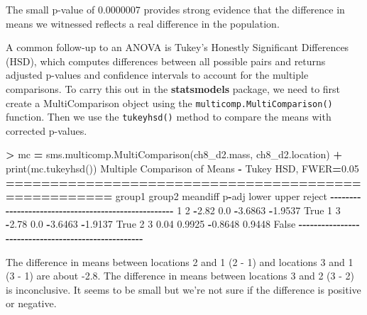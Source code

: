 \documentclass[
]{book}
\newenvironment{Shaded}{\begin{snugshade}}{\end{snugshade}}
\newcommand{\BuiltInTok}[1]{#1}
\newcommand{\DecValTok}[1]{\textcolor[rgb]{0.00,0.00,0.81}{#1}}
\newcommand{\FloatTok}[1]{\textcolor[rgb]{0.00,0.00,0.81}{#1}}
\newcommand{\NormalTok}[1]{#1}
\newcommand{\OperatorTok}[1]{\textcolor[rgb]{0.81,0.36,0.00}{\textbf{#1}}}
\newcommand{\VariableTok}[1]{\textcolor[rgb]{0.00,0.00,0.00}{#1}}
\begin{document}
The small p-value of 0.0000007 provides strong evidence that the difference in means we witnessed reflects a real difference in the population.

A common follow-up to an ANOVA is Tukey's Honestly Significant Differences (HSD), which computes differences between all possible pairs and returns adjusted p-values and confidence intervals to account for the multiple comparisons. To carry this out in the \textbf{statsmodels} package, we need to first create a MultiComparison object using the \texttt{multicomp.MultiComparison()} function. Then we use the \texttt{tukeyhsd()} method to compare the means with corrected p-values.

\begin{Shaded}
\begin{Highlighting}[]
\OperatorTok{\textgreater{}}\NormalTok{ mc }\OperatorTok{=}\NormalTok{ sms.multicomp.MultiComparison(ch8\_d2.mass, ch8\_d2.location)}
\OperatorTok{+} \BuiltInTok{print}\NormalTok{(mc.tukeyhsd())}
\NormalTok{Multiple Comparison of Means }\OperatorTok{{-}}\NormalTok{ Tukey HSD, FWER}\OperatorTok{=}\FloatTok{0.05} 
\OperatorTok{====================================================}
\NormalTok{group1 group2 meandiff p}\OperatorTok{{-}}\NormalTok{adj   lower   upper  reject}
\OperatorTok{{-}{-}{-}{-}{-}{-}{-}{-}{-}{-}{-}{-}{-}{-}{-}{-}{-}{-}{-}{-}{-}{-}{-}{-}{-}{-}{-}{-}{-}{-}{-}{-}{-}{-}{-}{-}{-}{-}{-}{-}{-}{-}{-}{-}{-}{-}{-}{-}{-}{-}{-}{-}}
     \DecValTok{1}      \DecValTok{2}    \OperatorTok{{-}}\FloatTok{2.82}    \FloatTok{0.0} \OperatorTok{{-}}\FloatTok{3.6863} \OperatorTok{{-}}\FloatTok{1.9537}   \VariableTok{True}
     \DecValTok{1}      \DecValTok{3}    \OperatorTok{{-}}\FloatTok{2.78}    \FloatTok{0.0} \OperatorTok{{-}}\FloatTok{3.6463} \OperatorTok{{-}}\FloatTok{1.9137}   \VariableTok{True}
     \DecValTok{2}      \DecValTok{3}     \FloatTok{0.04} \FloatTok{0.9925} \OperatorTok{{-}}\FloatTok{0.8648}  \FloatTok{0.9448}  \VariableTok{False}
\OperatorTok{{-}{-}{-}{-}{-}{-}{-}{-}{-}{-}{-}{-}{-}{-}{-}{-}{-}{-}{-}{-}{-}{-}{-}{-}{-}{-}{-}{-}{-}{-}{-}{-}{-}{-}{-}{-}{-}{-}{-}{-}{-}{-}{-}{-}{-}{-}{-}{-}{-}{-}{-}{-}}
\end{Highlighting}
\end{Shaded}

The difference in means between locations 2 and 1 (2 - 1) and locations 3 and 1 (3 - 1) are about -2.8. The difference in means between locations 3 and 2 (3 - 2) is inconclusive. It seems to be small but we're not sure if the difference is positive or negative.
\end{document}
